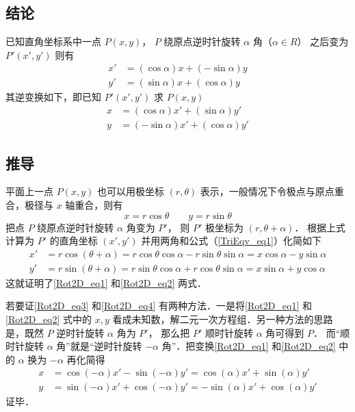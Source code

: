 
\subsection{结论}
已知直角坐标系中一点 $P(x,y)$， $P$ 绕原点逆时针旋转 $\alpha $ 角（$\alpha  \in R$） 之后变为 $P'(x',y')$ 则有
\begin{align}\label{Rot2D_eq1}
x' &= (\cos \alpha)x + (- \sin \alpha)y \\
\label{Rot2D_eq2}
y' &= (\sin \alpha)x + (\cos \alpha)y
\end{align}
其逆变换如下，即已知 $P'(x',y')$ 求 $P(x,y)$ 
\begin{align}\label{Rot2D_eq3}
x &= ( \cos \alpha  )x' + ( \sin \alpha  )y' \\
\label{Rot2D_eq4}
y &= ( - \sin \alpha  )x' + ( \cos \alpha )y'
\end{align}

\subsection{推导}

平面上一点 $P(x,y)$ 也可以用极坐标 $(r, \theta)$ 表示，一般情况下令极点与原点重合，极径与 $x$ 轴重合，则有
\begin{equation}
x = r\cos \theta \qquad y = r\sin \theta 
\end{equation}     
把点 $P$ 绕原点逆时针旋转 $\alpha $ 角变为 $P'$， 则 $P'$ 极坐标为 $(r, \theta  + \alpha)$． 根据上式计算为 $P'$ 的直角坐标 $(x', y')$ 并用两角和公式（\autoref{TriEqv_eq1}）化简如下
\begin{align}
x' &= r\cos(\theta  + \alpha) = r\cos\theta \cos\alpha  - r\sin\theta \sin\alpha  = x\cos\alpha  - y\sin\alpha \\
y' &= r\sin(\theta  + \alpha) = r\sin\theta \cos\alpha  + r\cos\theta \sin\alpha  = x\sin\alpha  + y\cos\alpha 
\end{align} 
这就证明了\autoref{Rot2D_eq1} 和\autoref{Rot2D_eq2} 两式．

若要证\autoref{Rot2D_eq3} 和\autoref{Rot2D_eq4} 有两种方法．一是将\autoref{Rot2D_eq1} 和\autoref{Rot2D_eq2} 式中的 $x, y$ 看成未知数，解二元一次方程组．另一种方法的思路是，既然 $P$ 逆时针旋转 $\alpha $ 角为 $P'$， 那么把 $P'$ 顺时针旋转 $\alpha$ 角可得到 $P$． 而“顺时针旋转 $\alpha$ 角”就是“逆时针旋转 $-\alpha $ 角”．把变换\autoref{Rot2D_eq1} 和\autoref{Rot2D_eq2} 中的 $\alpha$ 换为 $-\alpha$ 再化简得
 \begin{align}
x &= \cos(-\alpha) x' - \sin(-\alpha) y' = \cos(\alpha) x' + \sin(\alpha) y'\\
y &= \sin(-\alpha) x' + \cos(-\alpha) y' =  -\sin(\alpha) x' + \cos(\alpha) y'
\end{align}
证毕．
